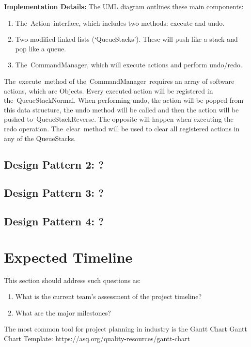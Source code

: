 \documentclass[12pt]{article}
\begin{document}
\newpage
\noindent \textbf{Implementation Details:} The UML diagram outlines these main components:\\
\begin{enumerate}
    \item The Action interface, which includes two methods: execute and undo.
    \item Two modified linked lists (‘QueueStacks’). These will push like a stack and pop like a queue.
    \item The CommandManager, which will execute actions and perform undo/redo.
\end{enumerate}	
The execute method of the CommandManager requires an array of software actions, which are Objects. Every executed action will be registered in the QueueStackNormal.  When performing undo, the action will be popped from this data structure, the undo method will be called and then the action will be pushed to QueueStackReverse.  The opposite will happen when executing the redo operation. The clear method will be used to clear all registered actions in any of the QueueStacks.

\subsection{Design Pattern 2: ?}

\subsection{Design Pattern 3: ?}

\subsection{Design Pattern 4: ?}
\newpage
\section{Expected Timeline}
This section should address such questions as:
\begin{enumerate}
    \item What is the current team’s assessment of the project timeline? 
    \item What are the major milestones?
\end{enumerate}

\noindent The most common tool for project planning in industry is the Gantt Chart
Gantt Chart Template: https://asq.org/quality-resources/gantt-chart
\end{document}
